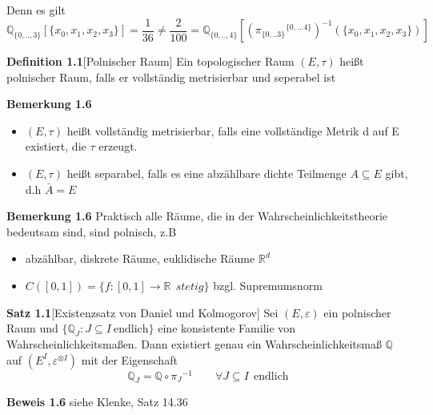 Denn es gilt
\begin{equation*}
\mathbb{Q}_{\lbrace 0,..,3 \rbrace}[\lbrace x_{0},x_{1},x_{2},x_{3} \rbrace] = \dfrac{1}{36} \neq \dfrac{2}{100} = \mathbb{Q}_{\lbrace 0,..,4 \rbrace}[{({\pi_{\lbrace 0,..3 \rbrace}}^{ \lbrace 0,...4 \rbrace})}^{-1}(\lbrace x_{0},x_{1},x_{2},x_{3} \rbrace)]
\end{equation*}

\textbf{Definition 1.1}[Polnischer Raum]
Ein topologischer Raum $(E,\tau)$ heißt polnischer Raum, falls er vollständig metrisierbar und seperabel ist

\textbf{Bemerkung 1.6}
\mbox{}  
\begin{itemize}
\item $(E,\tau)$ heißt vollständig metrisierbar, falls eine vollständige Metrik d auf E existiert, die $\tau$ erzeugt.
\item $(E,\tau)$ heißt separabel, falls es eine abzählbare dichte Teilmenge $A \subseteq E$ gibt, d.h $\bar{A} = E$ 
\end{itemize}

\textbf{Bemerkung 1.6}
Praktisch alle Räume, die in der Wahrscheinlichkeitstheorie bedeutsam sind, sind polnisch, z.B
\begin{itemize}
\item abzählbar, diskrete Räume, euklidische Räume $\mathbb{R}^{d}$
\item $C([0,1]) = \lbrace f:[0,1] \to \mathbb{R} \: \: stetig \rbrace$ bzgl. Supremumsnorm
\end{itemize}

\textbf{Satz 1.1}[Existenzsatz von Daniel und Kolmogorov]
\label{Existenzsatz von Daniel und Kolmogorov}
Sei $(E, \varepsilon)$ ein polnischer Raum und $\lbrace \mathbb{Q}_{J} : J \subseteq I \: \mathrm{endlich}\rbrace$ eine konsistente Familie von Wahrscheinlichkeitsmaßen. Dann existiert genau ein Wahrscheinlichkeitsmaß $\mathbb{Q}$ auf $(E^{I},\varepsilon^{ \otimes I})$ mit der Eigenschaft
\begin{equation}
{\mathbb{Q}}_{J} = \mathbb{Q} \circ {\pi_{J}}^{-1} \qquad \forall J \subseteq I \: \: \mathrm{endlich}
\label{eins}
\end{equation}

\textbf{Beweis 1.6}
siehe Klenke, Satz 14.36

